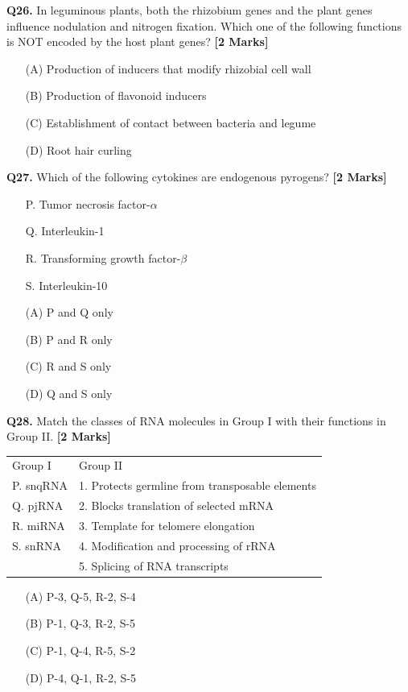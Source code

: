 \documentclass[11pt]{article}
\newcommand{\questionb}[2]{
    \noindent\textbf{Q#2.} #1 \hfill \textbf{[2 Marks]}
}
\begin{document}
\questionb{In leguminous plants, both the rhizobium genes and the plant genes influence nodulation and nitrogen fixation. Which one of the following functions is NOT encoded by the host plant genes?}{26}
\begin{enumerate}
    \item[(A)] Production of inducers that modify rhizobial cell wall
    \item[(B)] Production of flavonoid inducers
    \item[(C)] Establishment of contact between bacteria and legume
    \item[(D)] Root hair curling
\end{enumerate}
\vspace{0.5cm}

\questionb{Which of the following cytokines are endogenous pyrogens?}{27}
\begin{enumerate}
    \item[P.] Tumor necrosis factor-$\alpha$
    \item[Q.] Interleukin-1
    \item[R.] Transforming growth factor-$\beta$
    \item[S.] Interleukin-10
    \item[(A)] P and Q only
    \item[(B)] P and R only
    \item[(C)] R and S only
    \item[(D)] Q and S only
\end{enumerate}
\vspace{0.5cm}

\questionb{Match the classes of RNA molecules in Group I with their functions in Group II.}{28}
\begin{tabular}{ll}
Group I & Group II \\
P. snqRNA & 1. Protects germline from transposable elements \\
Q. pjRNA & 2. Blocks translation of selected mRNA \\
R. miRNA & 3. Template for telomere elongation \\
S. snRNA & 4. Modification and processing of rRNA \\
 & 5. Splicing of RNA transcripts \\
\end{tabular}
\begin{enumerate}
    \item[(A)] P-3, Q-5, R-2, S-4
    \item[(B)] P-1, Q-3, R-2, S-5
    \item[(C)] P-1, Q-4, R-5, S-2
    \item[(D)] P-4, Q-1, R-2, S-5
\end{enumerate}
\vspace{0.5cm}
\end{document}
